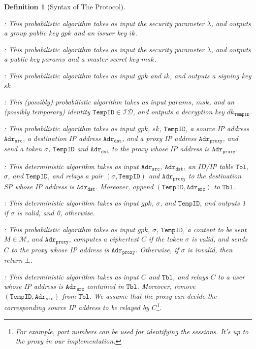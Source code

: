 \documentclass[preprint]{sig-alternate}
\newtheorem{definition}{Definition}[section]
\begin{document}
\begin{definition}[Syntax of The Protocol]~
\begin{description}
\setlength{\itemsep}{0em}\setlength{\parsep}{0em}
\item[${\sf GM.Setup}$]: This probabilistic algorithm takes as input the security parameter $\lambda$, and outputs a group public key $gpk$ and an issuer key $ik$.
\item[${\sf KGC.Setup}$]: This probabilistic algorithm takes as input the security parameter $\lambda$, and outputs a public key $params$ and a master secret key $msk$.  
\item[${\sf Join}$]: This probabilistic algorithm takes as input $gpk$ and $ik$, and outputs a signing key $sk$. 
\item[${\sf UserKeyGen}$]: This (possibly) probabilistic algorithm takes as input $params$, $msk$, and an (possibly temporary) identity $\mathtt{TempID}\in\mathcal{ID}$, and outputs a decryption key $dk_{\mathtt{TempID}}$. 
\item[${\sf SendRequest}$]: This probabilistic algorithm takes as input $gpk$, $sk$, $\mathtt{TempID}$, a source IP address $\mathtt{Adr_{src}}$, a destination IP address $\mathtt{Adr_{dst}}$, and a proxy IP address $\mathtt{Adr_{proxy}}$, and send a token $\sigma$, $\mathtt{TempID}$ and $\mathtt{Adr_{dst}}$ to the proxy whose IP address is $\mathtt{Adr_{proxy}}$. 
\item[${\sf RelayRequest}$]: This deterministic algorithm takes as input $\mathtt{Adr_{src}}$, $\mathtt{Adr_{dst}}$, an ID/IP table $\mathtt{Tbl}$, $\sigma$, and $\mathtt{TempID}$, and relays a pair $(\sigma,\mathtt{TempID})$ and $\mathtt{Adr_{proxy}}$ to the destination SP whose IP address is $\mathtt{Adr_{dst}}$. Moreover, append $(\mathtt{TempID}, \mathtt{Adr_{src}})$ to $\mathtt{Tbl}$.
\item[${\sf ValidityCheck}$]: This deterministic algorithm takes as input $gpk$, $\sigma$, and $\mathtt{TempID}$, and outputs 1 if $\sigma$ is valid, and 0, otherwise. 

\item[${\sf SendContent}$]: This probabilistic algorithm takes as input $gpk$, $\sigma$, $\mathtt{TempID}$, a content to be sent $M\in\mathcal{M}$, and $\mathtt{Adr_{proxy}}$, computes a ciphertext $C$ if the token $\sigma$ is valid, and sends $C$ to the proxy whose IP address is $\mathtt{Adr_{proxy}}$. Otherwise, if $\sigma$ is invalid, then return $\bot$. 

\item[${\sf RelayContent}$]: This deterministic algorithm takes as input $C$ and $\mathtt{Tbl}$, and relays $C$ to a user whose IP address is $\mathtt{Adr_{src}}$ contained in $\mathtt{Tbl}$. Moreover, remove $(\mathtt{TempID}, \mathtt{Adr_{src}})$ from $\mathtt{Tbl}$. 
We assume that the proxy can decide the corresponding source IP address to be relayed by $C$\footnote{For example, port numbers can be used for identifying the sessions. It's up to the proxy in our implementation.}. 


\end{description}
\end{definition}
\end{document}
